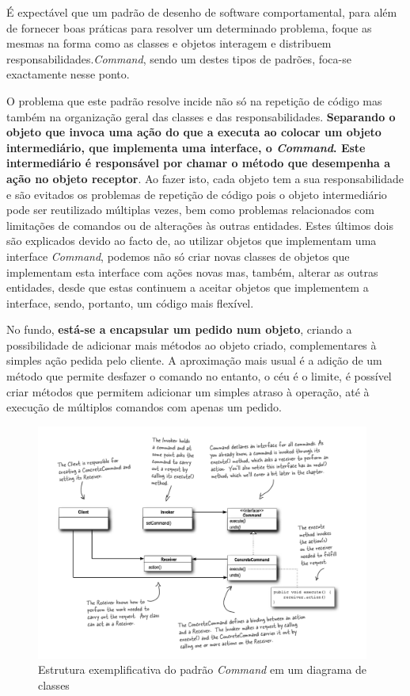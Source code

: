 \documentclass[10pt,portuguese]{article}
\begin{document}
\par É expectável que um padrão de desenho de software comportamental, para além de fornecer boas práticas para resolver um determinado problema, foque as mesmas na forma como as classes e objetos interagem e distribuem responsabilidades.\textit{Command}, sendo um destes tipos de padrões, foca-se exactamente nesse ponto.

\par O problema que este padrão resolve incide não só na repetição de código mas também na organização geral das classes e das responsabilidades. \textbf{Separando o objeto que invoca uma ação do que a executa ao colocar um objeto intermediário, que implementa uma interface, o \textit{Command}. Este intermediário é responsável por chamar o método que desempenha a ação no objeto receptor}.
Ao fazer isto, cada objeto tem a sua responsabilidade e são evitados os problemas de repetição de código pois o objeto intermediário pode ser reutilizado múltiplas vezes, bem como problemas relacionados com limitações de comandos ou de alterações às outras entidades. Estes últimos dois são explicados devido ao facto de, ao utilizar objetos que implementam uma interface \textit{Command}, podemos não só criar novas classes de objetos que implementam esta interface com ações novas mas, também, alterar as outras entidades, desde que estas continuem a aceitar objetos que implementem a interface, sendo, portanto, um código mais flexível.

\par No fundo, \textbf{está-se a encapsular um pedido num objeto}, criando a possibilidade de adicionar mais métodos ao objeto criado, complementares à simples ação pedida pelo cliente.
A aproximação mais usual é a adição de um método que permite desfazer o comando no entanto, o céu é o limite, é possível criar métodos que permitem adicionar um simples atraso à operação, até à execução de múltiplos comandos com apenas um pedido.


\begin{figure}[!h]
    \centering
    \includegraphics[width=415]{images/command/UML.png}
    \caption{Estrutura exemplificativa do padrão \textit{Command} em um diagrama de classes}
\end{figure}
\end{document}
